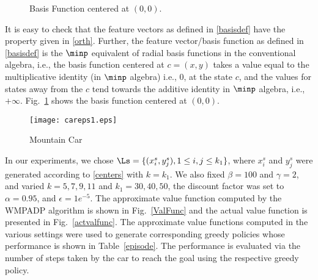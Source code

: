 \begin{figure}
\label{basisf}
\caption{Basis Function centered at $(0,0)$.}
\end{figure}
It is easy to check that the feature vectors as defined in \eqref{basisdef} have the property given in \eqref{orth}. Further, the feature vector/basis function as defined in \eqref{basisdef} is the $\minp$ equivalent of radial basis functions in the conventional algebra, i.e., the basis function centered at $c=(x,y)$ takes a value equal to the multiplicative identity (in $\minp$ algebra) i.e., $0$, at the state $c$, and the values for states away from the $c$ tend towards the additive identity in $\minp$ algebra, i.e., $+\infty$. Fig.~\ref{basisf} shows the basis function centered at $(0,0)$.\\
\begin{comment}
\begin{figure}
\label{mcar}

\caption{Mountain Car}
\end{figure}
\end{comment}
\begin{figure}
\centering
\texttt{[image: careps1.eps]}
\caption{Mountain Car}
\label{mcar}
\end{figure}
In our experiments, we chose $\Ls=\{(x_i^s,y_j^s), 1\leq i,j \leq k_1\}$, where $x_i^s$ and $y_j^s$ were generated according to \eqref{centers} with $k=k_1$. We also fixed $\beta=100$ and $\gamma=2$, and varied $k=5, 7, 9, 11$ and $k_1=30,40,50$, the discount factor was set to $\alpha=0.95$, and $\epsilon=1e^{-5}$. The approximate value function computed by the WMPADP algorithm is shown in Fig.~\ref{ValFunc} and the actual value function is presented in Fig.~\ref{actvalfunc}. The approximate value functions computed in the various settings were used to generate corresponding greedy policies whose performance is shown in Table~\ref{episode}. The performance is evaluated via the number of steps taken by the car to reach the goal using the respective greedy policy.
